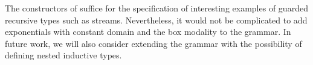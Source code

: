 The constructors of   suffice for the specification of interesting examples of guarded recursive types such as streams. Nevertheless, it would not be complicated to add exponentials with
constant domain and the box modality to the grammar.
In future work, we will also consider extending the grammar with the possibility of defining nested inductive types.


